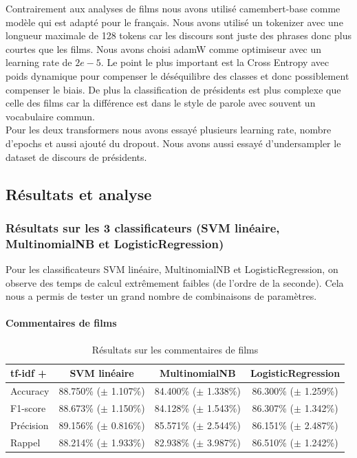 \documentclass{article}
\begin{document}
Contrairement aux analyses de films nous avons utilisé camembert-base comme modèle qui est adapté pour le français. Nous avons utilisé un tokenizer avec une longueur maximale de 128 tokens car les discours sont juste des phrases donc plus courtes que les films. Nous avons choisi adamW comme optimiseur avec un learning rate de $2e-5$. Le point le plus important est la Cross Entropy avec poids dynamique pour compenser le déséquilibre des classes et donc possiblement compenser le biais. De plus la classification de présidents est plus complexe que celle des films car la différence est dans le style de parole avec souvent un vocabulaire commun.\\

Pour les deux transformers nous avons essayé plusieurs learning rate, nombre d'epochs et aussi ajouté du dropout. Nous avons aussi essayé d'undersampler le dataset de discours de présidents.\\


\subsection{Résultats et analyse}

\subsubsection{Résultats sur les 3 classificateurs (SVM linéaire, MultinomialNB et LogisticRegression)}

Pour les classificateurs SVM linéaire, MultinomialNB et LogisticRegression, on observe des temps de calcul extrêmement faibles (de l'ordre de la seconde). Cela nous a permis de tester un grand nombre de combinaisons de paramètres.

\paragraph{Commentaires de films}

\begin{table}[h]
\centering
\begin{tabular}{lccc}
\toprule
tf-idf + & SVM linéaire & MultinomialNB & LogisticRegression \\
\midrule
Accuracy   & 88.750\% ($\pm$ 1.107\%) & 84.400\% ($\pm$ 1.338\%) & 86.300\% ($\pm$ 1.259\%) \\
F1-score   & 88.673\% ($\pm$ 1.150\%) & 84.128\% ($\pm$ 1.543\%) & 86.307\% ($\pm$ 1.342\%) \\
Précision  & 89.156\% ($\pm$ 0.816\%) & 85.571\% ($\pm$ 2.544\%) & 86.151\% ($\pm$ 2.487\%) \\
Rappel     & 88.214\% ($\pm$ 1.933\%) & 82.938\% ($\pm$ 3.987\%) & 86.510\% ($\pm$ 1.242\%) \\
\bottomrule
\end{tabular}
\caption{Résultats sur les commentaires de films}
\end{table}
\end{document}
